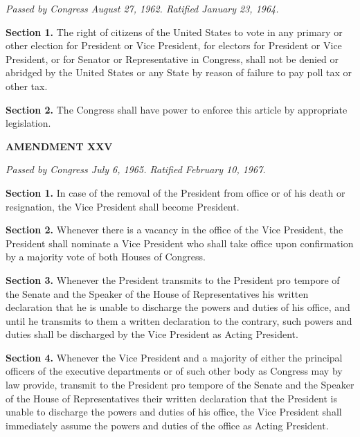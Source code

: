 \textit{Passed by Congress August 27, 1962. Ratified January 23, 1964.}

\textbf{Section 1.}
The right of citizens of the United States to vote in any primary or other election for President or Vice President, for electors for President or Vice President, or for Senator or Representative in Congress, shall not be denied or abridged by the United States or any State by reason of failure to pay poll tax or other tax.

\textbf{Section 2.}
The Congress shall have power to enforce this article by appropriate legislation.

\begin{center} 
\textbf{AMENDMENT XXV}
\end{center} 

\textit{Passed by Congress July 6, 1965. Ratified February 10, 1967.}

\textbf{Section 1.}
In case of the removal of the President from office or of his death or resignation, the Vice President shall become President.

\textbf{Section 2.}
Whenever there is a vacancy in the office of the Vice President, the President shall nominate a Vice President who shall take office upon confirmation by a majority vote of both Houses of Congress.

\textbf{Section 3.}
Whenever the President transmits to the President pro tempore of the Senate and the Speaker of the House of Representatives his written declaration that he is unable to discharge the powers and duties of his office, and until he transmits to them a written declaration to the contrary, such powers and duties shall be discharged by the Vice President as Acting President.

\textbf{Section 4.}
Whenever the Vice President and a majority of either the principal officers of the executive departments or of such other body as Congress may by law provide, transmit to the President pro tempore of the Senate and the Speaker of the House of Representatives their written declaration that the President is unable to discharge the powers and duties of his office, the Vice President shall immediately assume the powers and duties of the office as Acting President.


